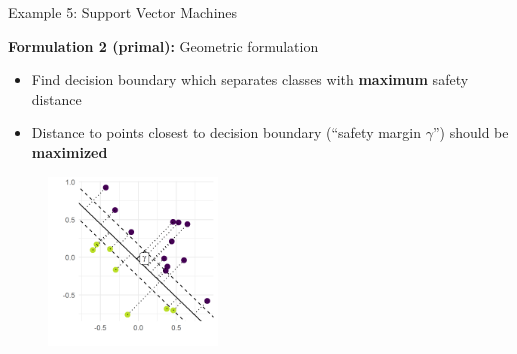 \begin{vbframe}{Example 5: Support Vector Machines}
\framebreak 

\textbf{Formulation 2 (primal): } Geometric formulation

\begin{itemize}
	\item Find decision boundary which separates classes with \textbf{maximum} safety distance
	\item Distance to points closest to decision boundary (\enquote{safety margin $\gamma$}) should be \textbf{maximized}
\end{itemize}

\begin{figure}
	\begin{center}
		\includegraphics[width=0.4\textwidth]{figure_man/svm-example.pdf}
	\end{center}
\end{figure}

\end{vbframe}

